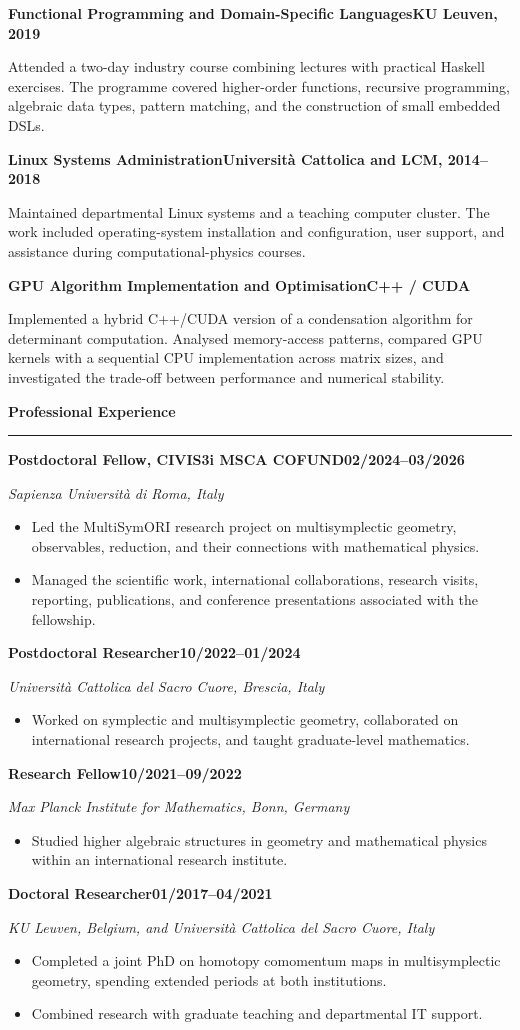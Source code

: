 \documentclass[11pt,a4paper]{article}
\newcommand{\cvsection}[1]{%
  \vspace{0.85em}%
  {\large\bfseries\color{accent} #1}\par
  \vspace{0.18em}\hrule\vspace{0.45em}%
}
\newcommand{\role}[4]{%
  \Needspace{6\baselineskip}%
  \textbf{#1}\hfill\textbf{#2}\par
  \textit{#3}\par
  \begin{itemize}#4\end{itemize}
  \vspace{0.3em}%
}
\newcommand{\project}[3]{%
  \textbf{#1}\hfill\textbf{#2}\par
  #3\par\vspace{0.7em}%
}
\begin{document}
\project{Functional Programming and Domain-Specific Languages}{KU Leuven, 2019}{
Attended a two-day industry course combining lectures with practical Haskell exercises. The programme covered higher-order functions, recursive programming, algebraic data types, pattern matching, and the construction of small embedded DSLs.}

\project{Linux Systems Administration}{Universit\`a Cattolica and LCM, 2014--2018}{
Maintained departmental Linux systems and a teaching computer cluster. The work included operating-system installation and configuration, user support, and assistance during computational-physics courses.}

\project{GPU Algorithm Implementation and Optimisation}{C++ / CUDA}{
Implemented a hybrid C++/CUDA version of a condensation algorithm for determinant computation. Analysed memory-access patterns, compared GPU kernels with a sequential CPU implementation across matrix sizes, and investigated the trade-off between performance and numerical stability.}

\cvsection{Professional Experience}

\role{Postdoctoral Fellow, CIVIS3i MSCA COFUND}{02/2024--03/2026}{Sapienza Universit\`a di Roma, Italy}{
  \item Led the MultiSymORI research project on multisymplectic geometry, observables, reduction, and their connections with mathematical physics.
  \item Managed the scientific work, international collaborations, research visits, reporting, publications, and conference presentations associated with the fellowship.
}


\role{Postdoctoral Researcher}{10/2022--01/2024}{Universit\`a Cattolica del Sacro Cuore, Brescia, Italy}{
  \item Worked on symplectic and multisymplectic geometry, collaborated on international research projects, and taught graduate-level mathematics.
}

\role{Research Fellow}{10/2021--09/2022}{Max Planck Institute for Mathematics, Bonn, Germany}{
  \item Studied higher algebraic structures in geometry and mathematical physics within an international research institute.
}

\role{Doctoral Researcher}{01/2017--04/2021}{KU Leuven, Belgium, and Universit\`a Cattolica del Sacro Cuore, Italy}{
  \item Completed a joint PhD on homotopy comomentum maps in multisymplectic geometry, spending extended periods at both institutions.
  \item Combined research with graduate teaching and departmental IT support.
}
\end{document}
